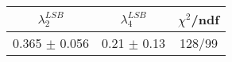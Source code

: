 \begin{tabular}{c|c||c}
$\lambda_{2}^{LSB}$ & $\lambda_4^{LSB}$ & $\chi^{2}$/ndf \\
\hline
0.365 $\pm$ 0.056 & 0.21 $\pm$ 0.13 & 128/99\\
\end{tabular}
